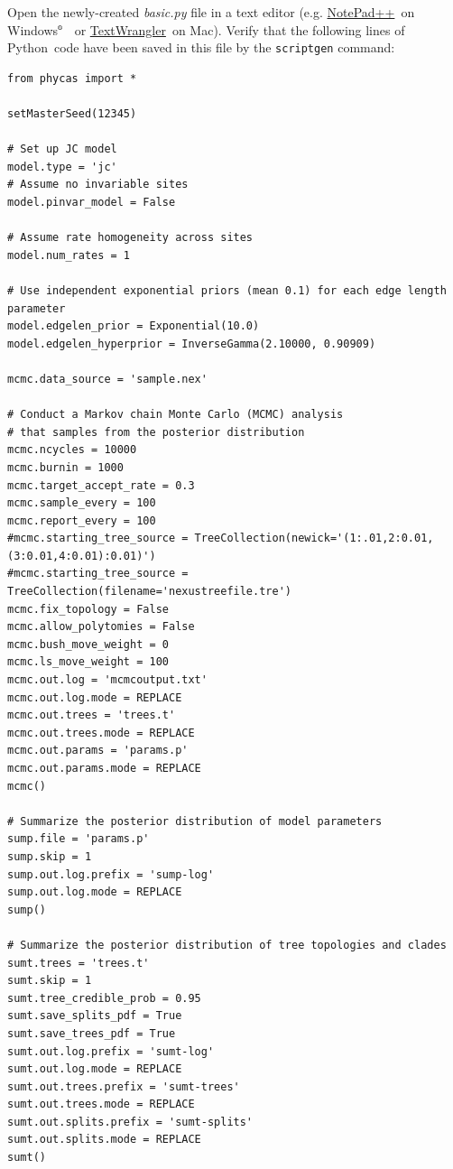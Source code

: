 \documentclass[10pt]{article}
\newcommand{\pathname}[1]{{\em #1}}				%
\newcommand{\cmd}[1]{{\tt \small #1}\index{#1}}	%
\newcommand{\Windows}{Windows$^{\mbox{\tiny\textregistered}}$ }
\newcommand{\textwrangler}{\href{http://www.barebones.com/products/TextWrangler/}{TextWrangler}}
\newcommand{\notepadpp}{\href{http://notepad-plus-plus.org/}{NotePad++}}
\newcommand{\python}{{\sc Python}\index{Python}}
\begin{document}
Open the newly-created \pathname{basic.py} file in a text editor (e.g. \notepadpp\ on \Windows\ or \textwrangler\ on Mac). Verify that the following lines of \python\ code have been saved in this file by the \cmd{scriptgen} command:
\begin{verbatim}
from phycas import *

setMasterSeed(12345)

# Set up JC model
model.type = 'jc'
# Assume no invariable sites
model.pinvar_model = False

# Assume rate homogeneity across sites
model.num_rates = 1

# Use independent exponential priors (mean 0.1) for each edge length parameter
model.edgelen_prior = Exponential(10.0)
model.edgelen_hyperprior = InverseGamma(2.10000, 0.90909)

mcmc.data_source = 'sample.nex'

# Conduct a Markov chain Monte Carlo (MCMC) analysis 
# that samples from the posterior distribution
mcmc.ncycles = 10000
mcmc.burnin = 1000
mcmc.target_accept_rate = 0.3
mcmc.sample_every = 100
mcmc.report_every = 100
#mcmc.starting_tree_source = TreeCollection(newick='(1:.01,2:0.01,(3:0.01,4:0.01):0.01)')
#mcmc.starting_tree_source = TreeCollection(filename='nexustreefile.tre')
mcmc.fix_topology = False
mcmc.allow_polytomies = False
mcmc.bush_move_weight = 0
mcmc.ls_move_weight = 100
mcmc.out.log = 'mcmcoutput.txt'
mcmc.out.log.mode = REPLACE
mcmc.out.trees = 'trees.t'
mcmc.out.trees.mode = REPLACE
mcmc.out.params = 'params.p'
mcmc.out.params.mode = REPLACE
mcmc()

# Summarize the posterior distribution of model parameters
sump.file = 'params.p'
sump.skip = 1
sump.out.log.prefix = 'sump-log'
sump.out.log.mode = REPLACE
sump()

# Summarize the posterior distribution of tree topologies and clades
sumt.trees = 'trees.t'
sumt.skip = 1
sumt.tree_credible_prob = 0.95 
sumt.save_splits_pdf = True
sumt.save_trees_pdf = True
sumt.out.log.prefix = 'sumt-log'
sumt.out.log.mode = REPLACE
sumt.out.trees.prefix = 'sumt-trees'
sumt.out.trees.mode = REPLACE
sumt.out.splits.prefix = 'sumt-splits'
sumt.out.splits.mode = REPLACE
sumt()
\end{verbatim}

\end{document}
